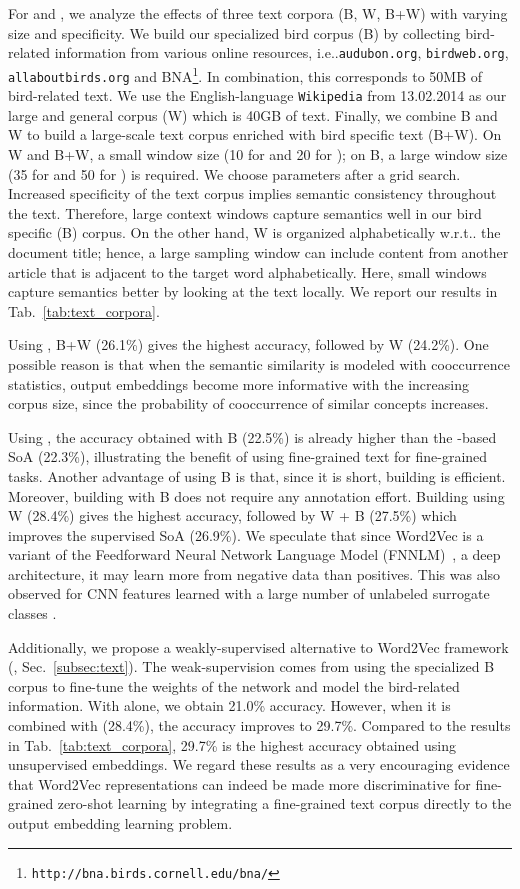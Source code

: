 \documentclass[10pt,twocolumn,letterpaper]{article}
\makeatletter
\newcommand{\myparagraph}[1]{\vspace{2pt}\noindent{\bf #1}}
\DeclareRobustCommand\onedot{\futurelet\@let@token\@onedot}
\def\@onedot{\ifx\@let@token.\else.\null\fi\xspace}
\def\ie{{i.e}\onedot} \def\Ie{{I.e}\onedot}
\def\wrt{w.r.t\onedot} \def\dof{d.o.f\onedot}
\makeatother
\begin{document}
\myparagraph{Effect of Text Corpus.} 
For  and , we analyze the effects of three text corpora (B, W, B+W) with varying size and specificity.
We build our specialized bird corpus (B) by collecting bird-related information from various online resources, \ie \texttt{audubon.org}, \texttt{birdweb.org}, \texttt{allaboutbirds.org} and BNA\footnote{\texttt{http://bna.birds.cornell.edu/bna/}}. In combination, this corresponds to 50MB of bird-related text.
We use the English-language \texttt{Wikipedia} from 13.02.2014 as our large and general corpus (W) which is 40GB of text.
Finally, we combine B and W to build a large-scale text corpus enriched with bird specific text (B+W).
On W and B+W, a small window size (10 for  and 20 for ); on B, a large window size (35 for  and 50 for ) is required. We choose parameters after a grid search. 
Increased specificity of the text corpus implies semantic consistency throughout the text. Therefore, large context windows capture semantics well in our bird specific (B) corpus. On the other hand, W is organized alphabetically \wrt the document title; hence, a large sampling window can include content from another article that is adjacent to the target word alphabetically. Here, small windows capture semantics better by looking at the text locally. We report our results in Tab.~\ref{tab:text_corpora}.

Using , B+W (26.1\%) gives the highest accuracy, followed by W (24.2\%).
One possible reason is that when the semantic similarity is modeled with cooccurrence statistics, output embeddings become more informative with the increasing corpus size, since the probability of cooccurrence of similar concepts increases. 


Using , the accuracy obtained with B (22.5\%) is already higher than the  -based SoA (22.3\%), illustrating the benefit of using fine-grained text for fine-grained tasks. Another advantage of using B is that, since it is short, building  is efficient. 
Moreover, building  with B does not require any annotation effort. Building  using W (28.4\%) gives the highest accuracy, followed by W + B (27.5\%) which improves the supervised SoA (26.9\%). 
We speculate that since Word2Vec is a variant of the Feedforward Neural Network Language Model (FNNLM)~\cite{BDVJ03}, a deep architecture, it may learn more from negative data than positives.
This was also observed for CNN features learned with a large number of unlabeled surrogate classes \cite{DSRB14}. 

Additionally, we propose a weakly-supervised alternative to Word2Vec framework (, Sec.~\ref{subsec:text}). The weak-supervision comes from using the specialized B corpus to fine-tune the weights of the network and model the bird-related information.
With  alone, we obtain 21.0\% accuracy.
However, when it is combined with  (28.4\%), the accuracy improves to 29.7\%. Compared to the results in Tab.~\ref{tab:text_corpora}, 29.7\% is the highest accuracy obtained using unsupervised embeddings. We regard these results as a very encouraging evidence that Word2Vec representations can indeed be made more discriminative for fine-grained zero-shot learning by integrating a fine-grained text corpus directly to the output embedding learning problem.
\end{document}
